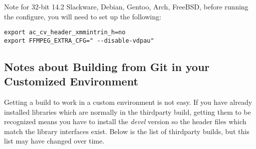 Note for 32-bit 14.2 Slackware, Debian, Gentoo, Arch, FreeBSD,
before running the configure, you will need to set up the following:

\begin{lstlisting}[style=sh]
export ac_cv_header_xmmintrin_h=no
export FFMPEG_EXTRA_CFG=" --disable-vdpau"
\end{lstlisting}


\subsection{Notes about Building from Git in your Customized Environment}%
\label{sub:notes_about_building_from_git_in_your_customized_environment}

Getting a build to work in a custom environment is not easy.  If you
have already installed libraries which are normally in the
thirdparty build, getting them to be recognized means you have to
install the \textit{devel} version so the header files which match
the library interfaces exist.  Below is the list of thirdparty
builds, but this list may have changed over time.

